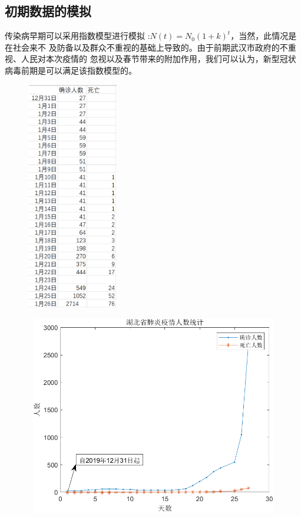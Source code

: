 \documentclass{article}
\begin{document}
\subsection{初期数据的模拟}
传染病早期可以采用指数模型进行模拟
:$N ( t )=N_0 (1+k)^t$，当然，此情况是在社会来不
及防备以及群众不重视的基础上导致的。由于前期武汉市政府的不重视、人民对本次疫情的
忽视以及春节带来的附加作用，我们可以认为，新型冠状病毒前期是可以满足该指数模型的。
\begin{figure}[h!]
                \centering
                \includegraphics[width=4cm,height=10cm]{12.png}
                \end{figure}
\begin{figure}[h!]
                \centering
                \includegraphics[width=12cm,height=8.7cm]{1.png}
                \end{figure}
\end{document}
